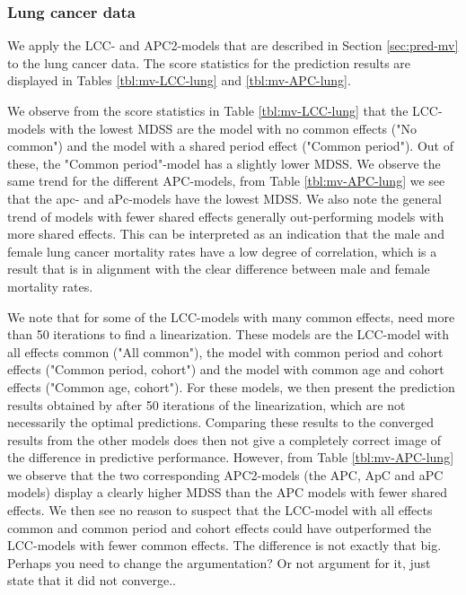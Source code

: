 \subsubsection{Lung cancer data}
\label{sec:mv-lung}
We apply the LCC- and APC2-models that are described in Section \ref{sec:pred-mv} to the lung cancer data. The score statistics for the prediction results are displayed in Tables \ref{tbl:mv-LCC-lung} and \ref{tbl:mv-APC-lung}. 

\newpar We observe from the score statistics in Table \ref{tbl:mv-LCC-lung} that the LCC-models with the lowest MDSS are the model with no common effects ("No common") and the model with a shared period effect ("Common period"). Out of these, the "Common period"-model has a slightly lower MDSS. We observe the same trend for the different APC-models, from Table \ref{tbl:mv-APC-lung} we see that the apc- and aPc-models have the lowest MDSS. We also note the general trend of models with fewer shared effects generally out-performing models with more shared effects. This can be interpreted as an indication that the male and female lung cancer mortality rates have a low degree of correlation, which is a result that is in alignment with the clear difference between male and female mortality rates. 

\newpar We note that for some of the LCC-models with many common effects, \inlabru need more than 50 iterations to find a linearization. These models are the LCC-model with all effects common ("All common"), the model with common period and cohort effects ("Common period, cohort") and the model with common age and cohort effects ("Common age, cohort"). For these models, we then present the prediction results obtained by \inlarbu after 50 iterations of the linearization, which are not necessarily the optimal predictions. Comparing these results to the converged results from the other models does then not give a completely correct image of the difference in predictive performance. However, from Table \ref{tbl:mv-APC-lung} we observe that the two corresponding APC2-models (the APC, ApC and aPC models) display a clearly higher MDSS than the APC models with fewer shared effects. We then see no reason to suspect that the LCC-model with all effects common and common period and cohort effects could have outperformed the LCC-models with fewer common effects. \textcolor{myDarkGreen}{The difference is not exactly that big. Perhaps you need to change the argumentation? Or not argument for it, just state that it did not converge..}

